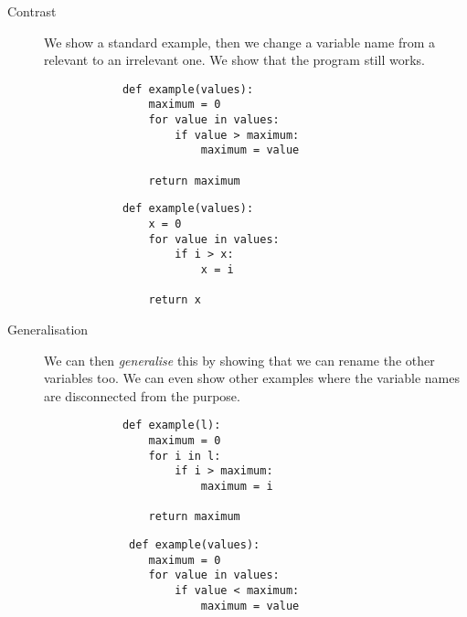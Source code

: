 \begin{description}
    \item [Contrast] We show a standard example, then we change a variable 
name from a relevant to an irrelevant one. We show that the program 
still works.
    
    \hfill
    \begin{minipage}[t]{0.45\columnwidth}
        \begin{verbatim}
            def example(values):
                maximum = 0
                for value in values:
                    if value > maximum:
                        maximum = value
    
                return maximum
        \end{verbatim}
    \end{minipage}
\hfill
    \begin{minipage}[t]{0.45\columnwidth}
        \begin{verbatim}
            def example(values):
                x = 0
                for value in values:
                    if i > x:
                        x = i
    
                return x
      \end{verbatim}
    \end{minipage}
\newline
    
    \item [Generalisation] We can then \emph{generalise} this by showing 
that we can rename the other variables too. We can even show other 
examples where the variable names are disconnected from the purpose.

    
    \hfill
    \begin{minipage}[t]{0.45\columnwidth}
        \begin{verbatim}
            def example(l):
                maximum = 0
                for i in l:
                    if i > maximum:
                        maximum = i
    
                return maximum
        \end{verbatim}
    \end{minipage}
\hfill
    \begin{minipage}[t]{0.45\columnwidth}
        \begin{verbatim}
             def example(values):
                maximum = 0
                for value in values:
                    if value < maximum:
                        maximum = value
    

\end{verbatim}
\end{minipage}
\end{description}
